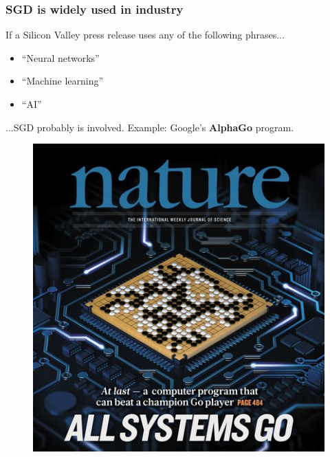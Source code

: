 \documentclass{beamer}
\begin{document}
\begin{frame}
	\frametitle{SGD is widely used in industry}
	If a Silicon Valley press release uses any of the following phrases...
	\begin{itemize}
		\item \small ``Neural networks''
		\item ``Machine learning''
		\item ``AI'' 
	\end{itemize}

	...SGD probably is involved. Example: Google's \textbf{AlphaGo} program.

	\begin{figure}[b]
	\centering
	\includegraphics[scale=0.25]{go}
	\end{figure}

\end{frame}
\end{document}

